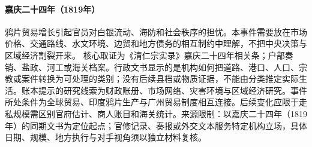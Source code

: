 \hypertarget{civic:EQ-1819-OPIUM-TRADE-GROWTH}{}\paragraph{嘉庆二十四年（1819年）}鸦片贸易增长引起官员对白银流动、海防和社会秩序的担忧。本事件需要放在市场价格、交通路线、水文环境、边贸和地方债务的相互制约中理解，不把中央决策与区域经济割裂开来。 核心取证为《清仁宗实录》嘉庆二十四年相关条；户部奏销、盐政、河工或海关档案。行政文书显示的是机构如何把道路、港口、人口、宗教或案件转换为可处理的类别；没有后续县档或物质证据，不能由分类推定实际生活。账本提示的研究线索为财政账册、市场网络、灾害环境与区域经济研究。事件所处条件为全球贸易、印度鸦片生产与广州贸易制度相互连接。后续变化应限于走私规模需区别官府估计、商人账目和海关统计。来源限制：以嘉庆二十四年（1819年）的同期文书为定位起点；官修记录、奏报或外交文本服务特定机构立场，具体日期、规模、地方执行与对手视角须以独立材料复核。
